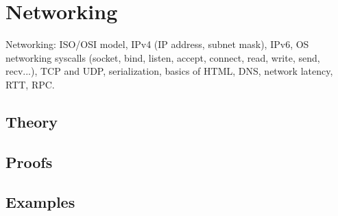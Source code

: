 
\section{Networking}
\label{sec:2.3b.08-networking}

\begin{ticket}
Networking: ISO/OSI model, IPv4 (IP address, subnet mask), IPv6, OS networking syscalls (socket, bind, listen, accept, connect, read, write, send, recv...), TCP and UDP, serialization, basics of HTML, DNS, network latency, RTT, RPC.
\end{ticket}

\subsection*{Theory}

\subsection*{Proofs}

\subsection*{Examples}
